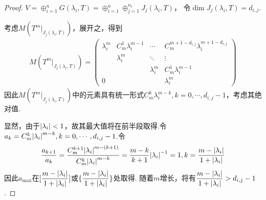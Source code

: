 \begin{proof}
    \(V=\oplus_{i=1}^n G(\lambda_i,T)=\oplus_{i=1}^n\oplus_{j=1}^{n_i} J_j(\lambda_i,T)\)，
    令\(\dim J_j(\lambda_i,T)=d_{i,j}\).

    考虑\(M(T^m|_{J_j(\lambda_i,T)})\)，展开之，得到
    \begin{align*}
        M(T^m|_{J_j(\lambda_i,T)})=
        \begin{pmatrix}
            \lambda_i^m & C_m^1 \lambda_i^{m-1} & \cdots      & C_m^{m+1-d_{i,j}} \lambda_i^{m+1-d_{i,j}} \\
                        & \lambda_i^m           & \ddots      & \vdots                                    \\
                        &                       & \lambda_i^m & C_m^1 \lambda_i^{m-1}                     \\
                 0      &                       &             & \lambda_i^m
        \end{pmatrix}
    \end{align*}
    因此\(M(T^m|_{J_j(\lambda_i,T)})\)中的元素具有统一形式\(C_m^k \lambda_i^{m-k},k=0,\cdots,d_{i,j}-1\)，考虑其绝对值.

    显然，由于\(\abs*{\lambda_i}<1\)，故其最大值将在前半段取得.令\(a_k=C_m^k \abs*{\lambda_i}^{m-k},k=0,\cdots,d_{i,j}-1\).令
    \begin{align*}
        \dfrac{a_{k+1}}{a_k}=\dfrac{C_m^{k+1}\abs*{\lambda_i}^{m-(k+1)}}{C_m^k \abs*{\lambda_i}^{m-k}}=
        \dfrac{m-k}{k+1} \abs*{\lambda_i}^{-1}=1,k=\dfrac{m-\abs*{\lambda_i}}{1+\abs*{\lambda_i}}
    \end{align*}
    因此\(a_{\max}\)在\([\dfrac{m-\abs*{\lambda_i}}{1+\abs*{\lambda_i}}]\)或\(\{\dfrac{m-\abs*{\lambda_i}}{1+\abs*{\lambda_i}}\}\)处取得.
    随着\(m\)增长，将有\(\dfrac{m-\abs*{\lambda_i}}{1+\abs*{\lambda_i}}>d_{i,j}-1\).


\end{proof}
